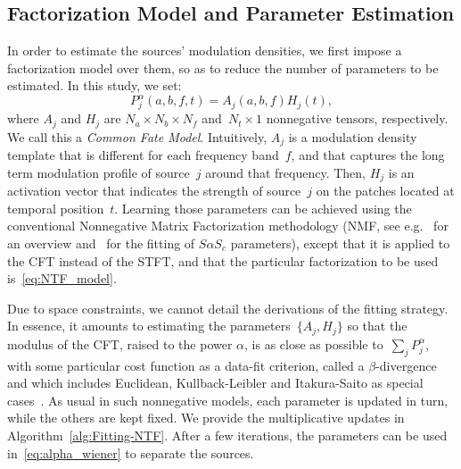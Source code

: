 \subsection{Factorization Model and Parameter Estimation}

\label{sub:NTF}

In order to estimate the sources' modulation densities, we first impose
a factorization model over them, so as to reduce the number of parameters
to be estimated. In this study, we set:
\begin{equation}
P_{j}^{\alpha}\left(a,b,f,t\right)=A_{j}\left(a,b,f\right)H_{j}\left(t\right),\label{eq:NTF_model}
\end{equation}
where $A_{j}$ and $H_{j}$ are $N_{a}\times N_{b}\times N_{f}$ and~$N_{t}\times1$
nonnegative tensors, respectively. We call this a \emph{Common Fate
Model}. Intuitively, $A_{j}$ is a modulation density template that
is different for each frequency band~$f$, and that captures the
long term modulation profile of source~$j$ around that frequency.
Then, $H_{j}$ is an activation vector that indicates the strength
of source~$j$ on the patches located at temporal position~$t$.
Learning those parameters can be achieved using the conventional Nonnegative
Matrix Factorization methodology (NMF, see e.g.~\cite{NMF-CICHOKI,ozerov2012general,sourceSepNMFReview2014}
for an overview and~\cite{liutkusNMF_FIM} for the fitting of $S\alpha S_{c}$
parameters), except that it is applied to the CFT instead of the STFT,
and that the particular factorization to be used is~\eqref{eq:NTF_model}.

Due to space constraints, we cannot detail the derivations of the
fitting strategy. In essence, it amounts to estimating the parameters~$\{ A_{j},H_{j}\} $
so that the modulus of the CFT, raised to the power $\alpha$, is
as close as possible to~$\sum_{j}P_{j}^{\alpha}$, with some particular
cost function as a data-fit criterion, called a $\beta$-divergence
and which includes Euclidean, Kullback-Leibler and Itakura-Saito as
special cases~\cite{NMF-betadivUR}. As usual in such nonnegative models,
each parameter is updated in turn, while the others are kept fixed.
We provide the multiplicative updates in Algorithm~\ref{alg:Fitting-NTF}.
After a few iterations, the parameters can be used in~\eqref{eq:alpha_wiener} to separate
the sources.

